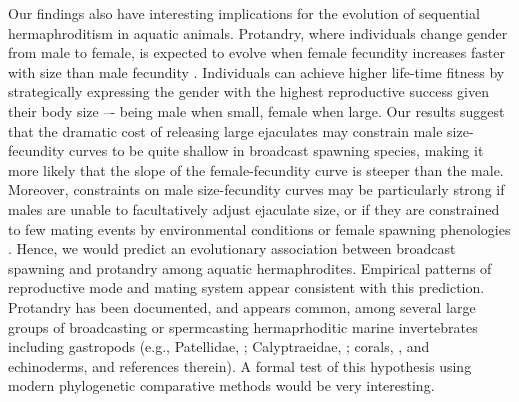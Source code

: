 \documentclass{article}
\begin{document}
Our findings also have interesting implications for the evolution of sequential hermaphroditism in aquatic animals. Protandry, where individuals change gender from male to female, is expected to evolve when female fecundity increases faster with size than male fecundity \citep{Ghiselin1969, Warner1975, Warner1988, MundayWarner2006}. Individuals can achieve higher life-time fitness by strategically expressing the gender with the highest reproductive success given their body size –- being male when small, female when large. Our results suggest that the dramatic cost of releasing large ejaculates may constrain male size-fecundity curves to be quite shallow in broadcast spawning species, making it more likely that the slope of the female-fecundity curve is steeper than the male. Moreover, constraints on male size-fecundity curves may be particularly strong if males are unable to facultatively adjust ejaculate size, or if they are constrained to few mating events by environmental conditions or female spawning phenologies \citep{Olito2015, Olito2017}. Hence, we would predict an evolutionary association between broadcast spawning and protandry among aquatic hermaphrodites. Empirical patterns of reproductive mode and mating system appear consistent with this prediction. Protandry has been documented, and appears common, among several large groups of broadcasting or spermcasting hermaprhoditic marine invertebrates including gastropods (e.g., Patellidae, \citealt{QuesneHawkins2006}; Calyptraeidae, \citealt{Coe1936}; corals, \citealt{LoyaSakai2008}, and echinoderms, \citealt{Sewell1994} and references therein). A formal test of this hypothesis using modern phylogenetic comparative methods would be very interesting.




\newpage{}
\end{document}
